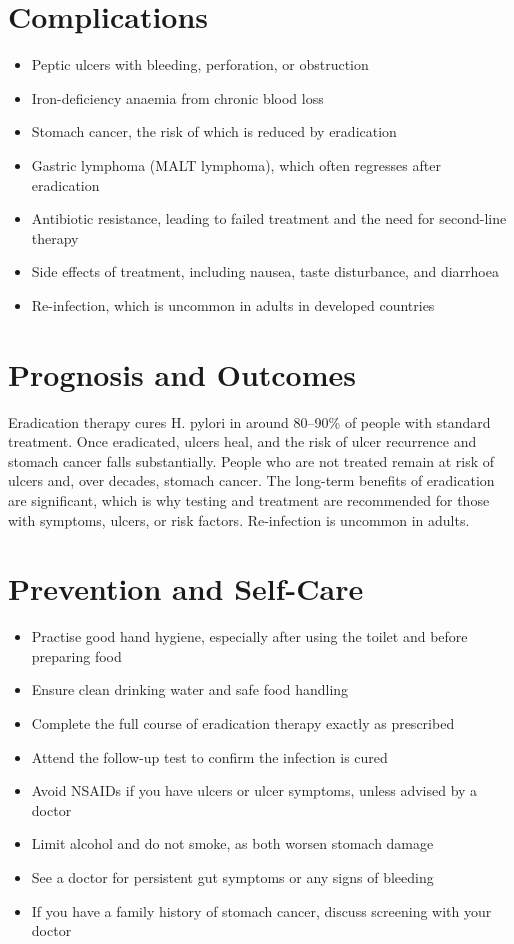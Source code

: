 \section*{Complications}
\begin{itemize}
    \item Peptic ulcers with bleeding, perforation, or obstruction
    \item Iron-deficiency anaemia from chronic blood loss
    \item Stomach cancer, the risk of which is reduced by eradication
    \item Gastric lymphoma (MALT lymphoma), which often regresses after eradication
    \item Antibiotic resistance, leading to failed treatment and the need for second-line therapy
    \item Side effects of treatment, including nausea, taste disturbance, and diarrhoea
    \item Re-infection, which is uncommon in adults in developed countries
\end{itemize}

\section*{Prognosis and Outcomes}
Eradication therapy cures H. pylori in around 80--90\% of people with standard treatment. Once eradicated, ulcers heal, and the risk of ulcer recurrence and stomach cancer falls substantially. People who are not treated remain at risk of ulcers and, over decades, stomach cancer. The long-term benefits of eradication are significant, which is why testing and treatment are recommended for those with symptoms, ulcers, or risk factors. Re-infection is uncommon in adults.

\section*{Prevention and Self-Care}
\begin{itemize}
    \item Practise good hand hygiene, especially after using the toilet and before preparing food
    \item Ensure clean drinking water and safe food handling
    \item Complete the full course of eradication therapy exactly as prescribed
    \item Attend the follow-up test to confirm the infection is cured
    \item Avoid NSAIDs if you have ulcers or ulcer symptoms, unless advised by a doctor
    \item Limit alcohol and do not smoke, as both worsen stomach damage
    \item See a doctor for persistent gut symptoms or any signs of bleeding
    \item If you have a family history of stomach cancer, discuss screening with your doctor
\end{itemize}

